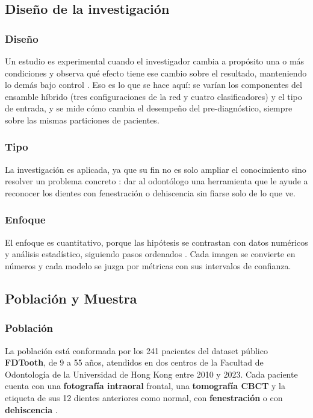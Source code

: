 \documentclass[12pt,a4paper]{article}
\newcommand{\prob}[1]{\textcolor{problema}{\textbf{#1}}}
\newcommand{\dat}[1]{\textcolor{dataset}{\textbf{#1}}}
\newcommand{\prob}[1]{#1}
\newcommand{\dat}[1]{#1}
\begin{document}
\subsection{Diseño de la investigación}
\subsubsection{Diseño}
Un estudio es experimental cuando el investigador cambia a propósito una
o más condiciones y observa qué efecto tiene ese cambio sobre el
resultado, manteniendo lo demás bajo control
\parencite{hernandez2018metodologia}. Eso es lo que se hace aquí: se
varían los componentes del ensamble híbrido (tres configuraciones de la
red y cuatro clasificadores) y el tipo de entrada, y se mide cómo cambia
el desempeño del pre-diagnóstico, siempre sobre las mismas particiones de
pacientes.

\subsubsection{Tipo}
La investigación es aplicada, ya que su fin no es solo ampliar el
conocimiento sino resolver un problema concreto
\parencite{hernandez2018metodologia}: dar al odontólogo una herramienta
que le ayude a reconocer los dientes con fenestración o dehiscencia sin
fiarse solo de lo que ve.

\subsubsection{Enfoque}
El enfoque es cuantitativo, porque las hipótesis se contrastan con datos
numéricos y análisis estadístico, siguiendo pasos ordenados
\parencite{hernandez2018metodologia}. Cada imagen se convierte en números
y cada modelo se juzga por métricas con sus intervalos de confianza.

\subsection{Población y Muestra}
\subsubsection{Población}
La población está conformada por los 241 pacientes del dataset público
\dat{FDTooth}, de 9 a 55 años, atendidos en dos centros de la Facultad de
Odontología de la Universidad de Hong Kong entre 2010 y 2023. Cada
paciente cuenta con una \dat{fotografía intraoral} frontal, una
\dat{tomografía CBCT} y la etiqueta de sus 12 dientes anteriores como
normal, con \prob{fenestración} o con \prob{dehiscencia}
\parencite{liu2025fdtooth}.
\end{document}
